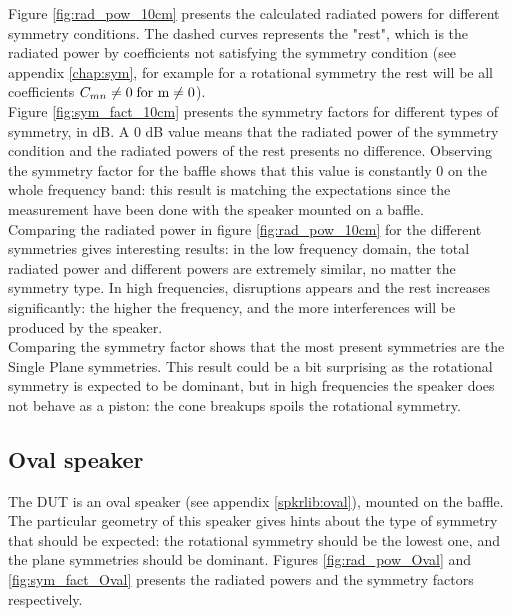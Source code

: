 \documentclass{report}
\begin{document}
Figure \ref{fig:rad_pow_10cm} presents the calculated radiated powers for different symmetry conditions. The dashed curves represents the "rest", which is the radiated power by coefficients not satisfying the symmetry condition (see appendix \ref{chap:sym}, for example for a rotational symmetry the rest will be all coefficients $C_{mn} \neq 0 \;  \textup{for m}  \neq 0$). \\

Figure \ref{fig:sym_fact_10cm} presents the symmetry factors for different types of symmetry, in dB. A 0 dB value means that the radiated power of the symmetry condition and the radiated powers of the rest presents no difference. Observing the symmetry factor for the baffle shows that this value is constantly 0 on the whole frequency band: this result is matching the expectations since the measurement have been done with the speaker mounted on a baffle. \\

Comparing the radiated power in figure \ref{fig:rad_pow_10cm} for the different symmetries gives interesting results: in the low frequency domain, the total radiated power and different powers are extremely similar, no matter the symmetry type. In high frequencies, disruptions appears and the rest increases significantly: the higher the frequency, and the more interferences will be produced by the speaker. \\

Comparing the symmetry factor shows that the most present symmetries are the Single Plane symmetries. This result could be a bit surprising as the rotational symmetry is expected to be dominant, but in high frequencies the speaker does not behave as a piston: the cone breakups spoils the rotational symmetry. 

\subsection{Oval speaker}
The DUT is an oval speaker (see appendix \ref{spkrlib:oval}), mounted on the baffle. The particular geometry of this speaker gives hints about the type of symmetry that should be expected: the rotational symmetry should be the lowest one, and the plane symmetries should be dominant.  Figures \ref{fig:rad_pow_Oval} and \ref{fig:sym_fact_Oval} presents the radiated powers and the symmetry factors respectively.\\
\end{document}

